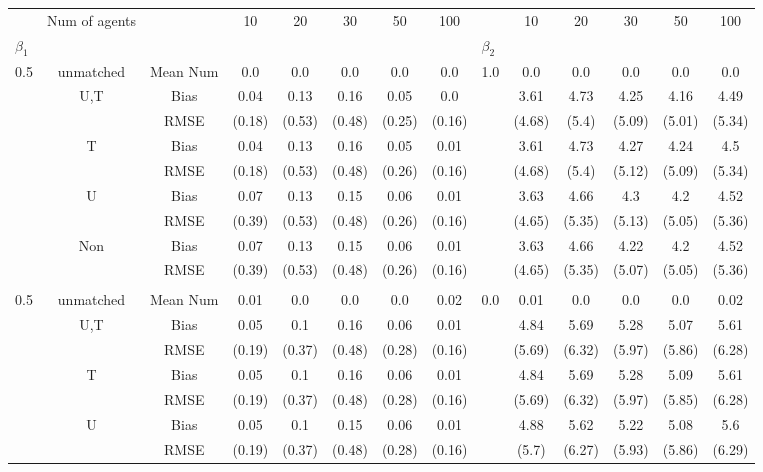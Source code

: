 \begin{tabular}{@{\extracolsep{5pt}}lc|cccccc|lccccc}
\toprule 
 & Num of agents &  & 10 & 20 & 30 & 50 & 100 &  & 10 & 20 & 30 & 50 & 100 \\
$\beta_1$ &  &  &  &  &  &  &  & $\beta_2$ &  &  &  &  &  \\
\midrule 
0.5 & unmatched & Mean Num & 0.0 & 0.0 & 0.0 & 0.0 & 0.0 & 1.0 & 0.0 & 0.0 & 0.0 & 0.0 & 0.0 \\
 & U,T & Bias & 0.04 & 0.13 & 0.16 & 0.05 & 0.0 &  & 3.61 & 4.73 & 4.25 & 4.16 & 4.49 \\
 &  & RMSE & (0.18) & (0.53) & (0.48) & (0.25) & (0.16) &  & (4.68) & (5.4) & (5.09) & (5.01) & (5.34) \\
 & T & Bias & 0.04 & 0.13 & 0.16 & 0.05 & 0.01 &  & 3.61 & 4.73 & 4.27 & 4.24 & 4.5 \\
 &  & RMSE & (0.18) & (0.53) & (0.48) & (0.26) & (0.16) &  & (4.68) & (5.4) & (5.12) & (5.09) & (5.34) \\
 & U & Bias & 0.07 & 0.13 & 0.15 & 0.06 & 0.01 &  & 3.63 & 4.66 & 4.3 & 4.2 & 4.52 \\
 &  & RMSE & (0.39) & (0.53) & (0.48) & (0.26) & (0.16) &  & (4.65) & (5.35) & (5.13) & (5.05) & (5.36) \\
 & Non & Bias & 0.07 & 0.13 & 0.15 & 0.06 & 0.01 &  & 3.63 & 4.66 & 4.22 & 4.2 & 4.52 \\
 &  & RMSE & (0.39) & (0.53) & (0.48) & (0.26) & (0.16) &  & (4.65) & (5.35) & (5.07) & (5.05) & (5.36) \\
 &  &  &  &  &  &  &  &  &  &  &  &  &  \\
0.5 & unmatched & Mean Num & 0.01 & 0.0 & 0.0 & 0.0 & 0.02 & 0.0 & 0.01 & 0.0 & 0.0 & 0.0 & 0.02 \\
 & U,T & Bias & 0.05 & 0.1 & 0.16 & 0.06 & 0.01 &  & 4.84 & 5.69 & 5.28 & 5.07 & 5.61 \\
 &  & RMSE & (0.19) & (0.37) & (0.48) & (0.28) & (0.16) &  & (5.69) & (6.32) & (5.97) & (5.86) & (6.28) \\
 & T & Bias & 0.05 & 0.1 & 0.16 & 0.06 & 0.01 &  & 4.84 & 5.69 & 5.28 & 5.09 & 5.61 \\
 &  & RMSE & (0.19) & (0.37) & (0.48) & (0.28) & (0.16) &  & (5.69) & (6.32) & (5.97) & (5.85) & (6.28) \\
 & U & Bias & 0.05 & 0.1 & 0.15 & 0.06 & 0.01 &  & 4.88 & 5.62 & 5.22 & 5.08 & 5.6 \\
 &  & RMSE & (0.19) & (0.37) & (0.48) & (0.28) & (0.16) &  & (5.7) & (6.27) & (5.93) & (5.86) & (6.29) \\

\end{tabular}
